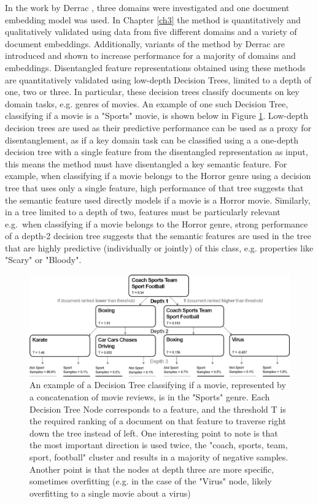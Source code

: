 In the work by Derrac  \cite{Derrac2015}, three domains were investigated and one document embedding model was used. In Chapter \ref{ch3} the method is quantitatively and qualitatively validated using data from five different domains and a variety of document embeddings. Additionally, variants of the method by Derrac \cite{Derrac2015} are introduced and shown to increase performance for a majority of domains and embeddings.  Disentangled feature representations obtained using these methods are quantitatively validated using  low-depth Decision Trees, limited to a depth of one, two or three. In particular, these decision trees classify documents on key domain tasks, e.g. genres of movies. An example of one such Decision Tree, classifying if a movie is a "Sports" movie, is shown below in Figure \ref{ch1:DecisionTree}. Low-depth decision trees are used as their predictive performance can be used as a proxy for disentanglement, as if a key domain task can be classified using a a one-depth decision tree with a single feature from the disentangled representation as input, this means the method must have disentangled a key semantic feature. For example, when classifying if a movie belongs to the Horror genre using  a decision tree that uses only a single feature,  high performance of that tree suggests that the semantic feature used directly models if a movie is a Horror movie. Similarly, in a tree limited to a depth of two,  features must be particularly relevant e.g.\ when classifying if a movie belongs to the Horror genre, strong performance of a depth-2 decision tree suggests that the semantic features are used in the tree that are highly predictive (individually or jointly) of this class, e.g. properties like "Scary" or "Bloody". 

\begin{figure}[t]
	\includegraphics[width=450px]{images/decision_tree_ex.png}
	\centering
	\caption{An example of a Decision Tree classifying if a movie, represented by a concatenation of movie reviews, is in the "Sports" genre. Each Decision Tree Node corresponds to a feature, and the threshold T is the required ranking of a document on that feature to traverse right down the tree instead of left. One interesting point to note is that the most important direction is used twice, the "coach, sports, team, sport, football" cluster and results in a majority of negative samples. Another point is that the nodes at depth three are more specific, sometimes overfitting (e.g. in the case of the "Virus" node, likely overfitting to a single movie about a virus) }\label{ch1:DecisionTree}
\end{figure}

